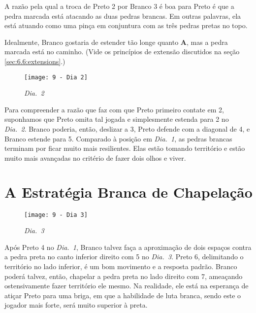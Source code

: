A razão pela qual a troca de Preto 2 por Branco 3 é boa para Preto é que a pedra marcada está atacando as duas pedras brancas. Em outras palavras, ela está atuando como uma pinça em conjuntura com as três pedras pretas no topo.

Idealmente, Branco gostaria de estender tão longe quanto \textbf{A}, mas a pedra marcada está no caminho. (Vide os princípios de extensão discutidos na seção \autoref{sec:6.6:extensions}.)

\begin{wrapfigure}{l}{60mm}
    \vspace{-25pt}
    \begin{center}
        \texttt{[image: 9 - Dia 2]}
        \captionsetup{justification=centering}
        \caption*{\emph{Dia.\@~2}}
    \end{center}
    \vspace{-30pt}
\end{wrapfigure}

Para compreender a razão que faz com que Preto primeiro contate em 2, suponhamos que Preto omita tal jogada e simplesmente estenda para 2 no \emph{Dia.\@~2}. Branco poderia, então, deslizar a 3, Preto defende com a diagonal de 4, e Branco estende para 5. Comparado à posição em \emph{Dia.\@~1}, as pedras brancas terminam por ficar muito mais resilientes. Elas estão tomando território e estão muito mais avançadas no critério de fazer dois olhos e viver.

\pagebreak

\section{A Estratégia Branca de Chapelação}

\begin{wrapfigure}{r}{60mm}
    \vspace{-27.5pt}
    \begin{center}
        \texttt{[image: 9 - Dia 3]}
        \captionsetup{justification=centering}
        \caption*{\emph{Dia.\@~3}}
    \end{center}
    \vspace{-30pt}
\end{wrapfigure}

Após Preto 4 no \emph{Dia.\@~1}, Branco talvez faça a aproximação de dois espaços contra a pedra preta no canto inferior direito com 5 no \emph{Dia.\@~3}. Preto 6, delimitando o território no lado inferior, é um bom movimento e a resposta padrão. Branco poderá talvez, então, chapelar a pedra preta no lado direito com 7, ameaçando ostensivamente fazer território ele mesmo. Na realidade, ele está na esperança de atiçar Preto para uma briga, em que a habilidade de luta branca, sendo este o jogador mais forte, será muito superior à preta.

